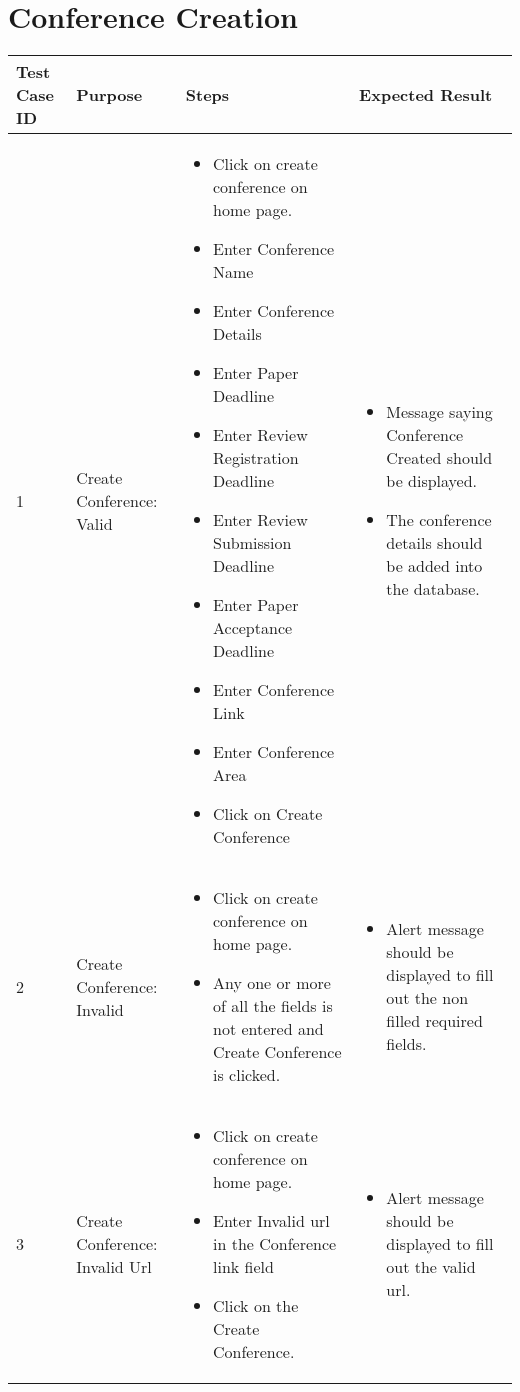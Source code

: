 \documentclass[english,a4paper,12pt]{report}
\begin{document}
\section{Conference Creation}
\begin{longtable} { | p{2cm} | p{3cm}| p{6cm}| p{6cm} |} 
\hline 
\textbf{Test Case ID} & \textbf{Purpose}  & \textbf{Steps} &\textbf{Expected Result} \\
\hline 1 &  Create Conference: Valid &  
\vspace{-5mm}
\begin{itemize}
\item Click on create conference on home page.
\item Enter Conference Name
\item Enter Conference Details
\item Enter Paper Deadline
\item Enter Review Registration Deadline
\item Enter Review Submission Deadline 
\item Enter Paper Acceptance Deadline
\item Enter Conference Link
\item Enter Conference Area
\item Click on Create Conference
\end{itemize}& 
\vspace{-5mm}
\begin{itemize}
\item Message saying Conference Created should be displayed.
\item The conference details should be added into the database.
\end{itemize}\\ 
\hline 2 &  Create Conference: Invalid
&\vspace{-5mm}
\begin{itemize}
\item Click on create conference on home page.
\item Any one or more of all the fields is not entered and Create Conference is clicked.
\end{itemize}& 
\vspace{-5mm}
\begin{itemize}
\item Alert message should be displayed to fill out the non filled required fields.
\end{itemize}\\
\hline 3 &  Create Conference: Invalid Url &  
\vspace{-5mm}
\begin{itemize}
\item Click on create conference on home page.
\item Enter Invalid url in the Conference link field
\item Click on the Create Conference.
\end{itemize}&
\vspace{-5mm}
\begin{itemize}
\item Alert message should be displayed to fill out the valid url.
\end{itemize}\\
\hline
\end{longtable}
\newpage 
\end{document}
